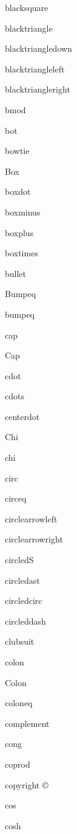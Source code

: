 \documentclass{article}
\begin{document}
blacksquare    \blacksquare{}

blacktriangle    \blacktriangle{}

blacktriangledown    \blacktriangledown{}

blacktriangleleft    \blacktriangleleft{}

blacktriangleright    \blacktriangleright{}

bmod    \bmod{}

bot    \bot{}

bowtie    \bowtie{}

Box    \Box{}

boxdot    \boxdot{}

boxminus    \boxminus{}

boxplus    \boxplus{}

boxtimes    \boxtimes{}

bullet    \bullet{}

Bumpeq    \Bumpeq{}

bumpeq    \bumpeq{}


cap    \cap{}

Cap    \Cap{}

cdot    \cdot{}

cdots    \cdots{}

centerdot    \centerdot{}

Chi    \Chi{}

chi    \chi{}

circ    \circ{}

circeq    \circeq{}

circlearrowleft    \circlearrowleft{}

circlearrowright    \circlearrowright{}

circledS    \circledS{}

circledast    \circledast{}

circledcirc    \circledcirc{}

circleddash    \circleddash{}

clubsuit    \clubsuit{}

colon    \colon{}

Colon    \Colon{}

coloneq    \coloneq{}

complement    \complement{}

cong    \cong{}

coprod    \coprod{}

copyright    \copyright{}

cos    \cos{}

cosh    \cosh{}
\end{document}
